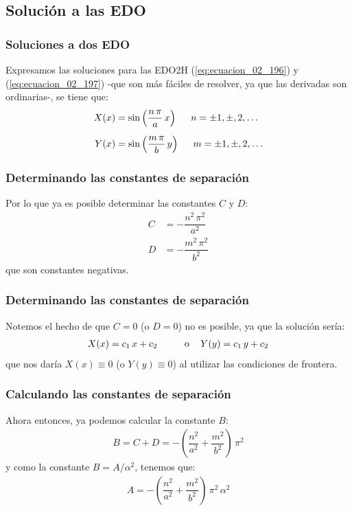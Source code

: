 \documentclass[12pt]{beamer}
\begin{document}
\subsection{Solución a las EDO}

\begin{frame}
\frametitle{Soluciones a dos EDO}
Expresamos las soluciones para las EDO2H (\ref{eq:ecuacion_02_196}) y (\ref{eq:ecuacion_02_197}) -que son más fáciles de resolver, ya que las derivadas son ordinarias-, se tiene que:
\begin{align}
X(x) &= \sin \left( \dfrac{n \, \pi}{a} \, x \right) \hspace{0.5cm} n = \pm 1, \pm, 2, \ldots \label{eq:ecuacion_02_202} \\[0.5em]
Y(x) &= \sin \left( \dfrac{m \, \pi}{b} \, y \right) \hspace{0.5cm} m = \pm 1, \pm, 2, \ldots \label{eq:ecuacion_02_203}
\end{align}
\end{frame}
\begin{frame}
\frametitle{Determinando las constantes de separación}
Por lo que ya es posible determinar las constantes $C$ y $D$:
\begin{align*}
C &= - \dfrac{n^{2} \, \pi^{2}}{a^{2}} \\[0.5em]
D &= - \dfrac{m^{2} \, \pi^{2}}{b^{2}}
\end{align*}
que son constantes negativas. 
\end{frame}
\begin{frame}
\frametitle{Determinando las constantes de separación}
Notemos el hecho de que $C = 0$ (o $D = 0$) no es posible, ya que la solución sería:
\begin{align*}
X(x) = c_{1} \, x + c_{2} \hspace{1cm} \mbox{o } \hspace{0.3cm} Y(y) = c_{1} \, y + c_{2}
\end{align*}
que nos daría $X(x) \equiv 0$ (o $Y(y) \equiv 0$) al utilizar las condiciones de frontera.
\end{frame}
\begin{frame}
\frametitle{Calculando las constantes de separación}
Ahora entonces, ya podemos calcular la constante $B$:
\begin{align*}
B = C + D =- \left( \dfrac{n^{2}}{a^{2}} + \dfrac{m^{2}}{b^{2}} \right) \, \pi^{2}
\end{align*}
\pause 
y como la constante $B = A / \alpha^{2}$, tenemos que:
\begin{align}
A = - \left( \dfrac{n^{2}}{a^{2}} + \dfrac{m^{2}}{b^{2}} \right) \, \pi^{2} \, \alpha^{2}
\label{eq:ecuacion_02_204}
\end{align}
\end{frame}
\end{document}
